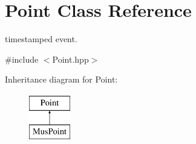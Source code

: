 \hypertarget{classPoint}{}\section{Point Class Reference}
\label{classPoint}


timestamped event.  




{\ttfamily \#include $<$Point.\+hpp$>$}

Inheritance diagram for Point\+:\begin{figure}[H]
\begin{center}
\leavevmode
\includegraphics[height=2.000000cm]{classPoint}
\end{center}
\end{figure}
